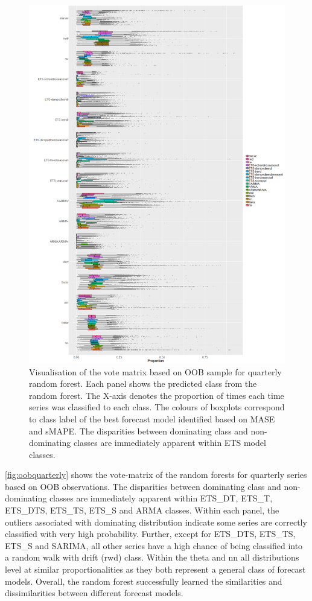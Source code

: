 \documentclass[11pt,a4paper,]{article}
\begin{document}
\begin{figure}
\centering
\includegraphics{figures/oobquarterly-1.png}
\caption{\label{fig:oobquarterly}Visualisation of the vote matrix based on OOB sample for quarterly random forest. Each panel shows the predicted class from the random forest. The X-axis denotes the proportion of times each time series was classified to each class. The colours of boxplots correspond to class label of the best forecast model identified based on MASE and sMAPE. The disparities between dominating class and non-dominating classes are immediately apparent within ETS model classes.}
\end{figure}

\autoref{fig:oobquarterly} shows the vote-matrix of the random forests for quarterly series based on OOB observations. The disparities between dominating class and non-dominating classes are immediately apparent within ETS\_DT, ETS\_T, ETS\_DTS, ETS\_TS, ETS\_S and ARMA classes. Within each panel, the outliers associated with dominating distribution indicate some series are correctly classified with very high probability. Further, except for ETS\_DTS, ETS\_TS, ETS\_S and SARIMA, all other series have a high chance of being classified into a random walk with drift (rwd) class. Within the theta and nn all distributions level at similar proportionalities as they both represent a general class of forecast models. Overall, the random forest successfully learned the similarities and dissimilarities between different forecast models.
\end{document}
